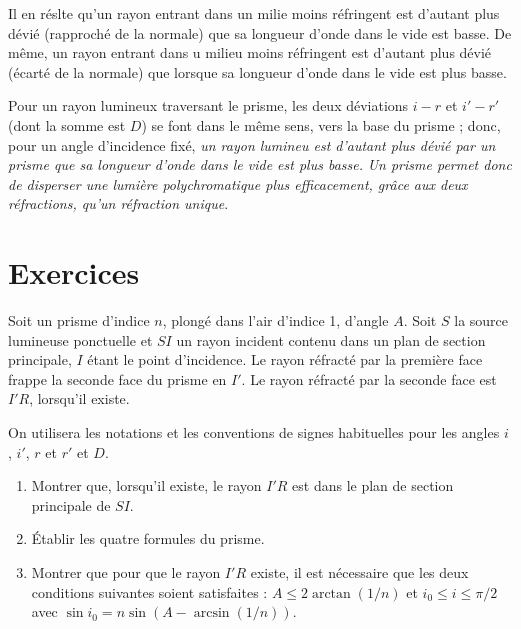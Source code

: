 Il en réslte qu'un rayon entrant dans un milie moins réfringent est d'autant plus dévié (rapproché de la normale) que sa longueur d'onde dans le vide est basse. De même, un rayon entrant dans u milieu moins réfringent est d'autant plus dévié (écarté de la normale) que lorsque sa longueur d'onde dans le vide est plus basse.

Pour un rayon lumineux traversant le prisme, les deux déviations $i-r$ et $i'-r'$ (dont la somme est $D$) se font dans le même sens, vers la base du prisme ; donc, pour un angle d'incidence fixé, \emph{un rayon lumineu est d'autant plus dévié par un prisme que sa longueur d'onde dans le vide est plus basse.}
\emph{Un prisme permet donc de disperser une lumière polychromatique plus efficacement, grâce aux deux réfractions, qu'un réfraction unique}.

\section{Exercices}

\begin{exercice}
	Soit un prisme d'indice $n$, plongé dans l'air d'indice 1, d'angle $A$.
	Soit $S$ la source lumineuse ponctuelle et $SI$ un rayon incident contenu dans un plan de section principale, $I$ étant le point d'incidence. Le rayon réfracté par la première face frappe la seconde face du prisme en $I'$. Le rayon réfracté par la seconde face est $I'R$, lorsqu'il existe.

	On utilisera les notations et les conventions de signes habituelles pour les angles $i$, $i'$, $r$ et $r'$ et $D$.
	\begin{enumerate}
\item Montrer que, lorsqu'il existe, le rayon $I'R$ est dans le plan de section principale de $SI$.
\item Établir les quatre formules du prisme.
\item Montrer que pour que le rayon $I'R$ existe, il est nécessaire que les deux conditions suivantes soient satisfaites : $A \leq 2 \arctan(1/n)$ et $i_0 \leq i \leq \pi/2$ avec $\sin i_0 = n \sin\left(A-\arcsin(1/n)\right)$.
	\end{enumerate}
\end{exercice}


